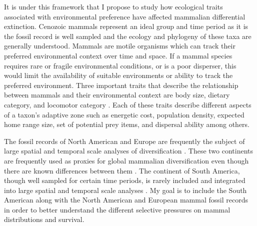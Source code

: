 \documentclass[11pt,letterpaper]{article}
\begin{document}
It is under this framework that I propose to study how ecological traits associated with environmental preference have affected mammalian differential extinction. Cenozoic mammals represent an ideal group and time period as it is the fossil record is well sampled and the ecology and phylogeny of these taxa are generally understood. Mammals are motile organisms which can track their preferred environmental context over time and space. If a mammal species requires rare or fragile environmental conditions, or is a poor disperser, this would limit the availability of suitable environments or ability to track the preferred environment. Three important traits that describe the relationship between mammals and their environmental context are body size, dietary category, and locomotor category \citep{Smith2004,Smith2008b,Damuth1981a,Damuth1979,Jernvall2004,Lyons2005,Lyons2010}. Each of these traits describe different aspects of a taxon's adaptive zone such as energetic cost, population density, expected home range size, set of potential prey items, and dispersal ability among others. 

The fossil records of North American and Europe are frequently the subject of large spatial and temporal scale analyses of diversification \citep{Jernvall2004,Jernvall2002,Fortelius2002,Janis2000,Alroy1996a,Alroy1998,Alroy2000g,Liow2008,Raia2006,Tomiya2013}. These two continents are frequently used as proxies for global mammalian diversification even though there are known differences between them \citep{Liow2008,Tomiya2013}. The continent of South America, though well sampled for certain time periods, is rarely included and integrated into large spatial and temporal scale analyses \citep{Stromberg2013,Marshall1982}. My goal is to include the South American along with the North American and European mammal fossil records in order to better understand the different selective pressures on mammal distributions and survival.

\end{document}
